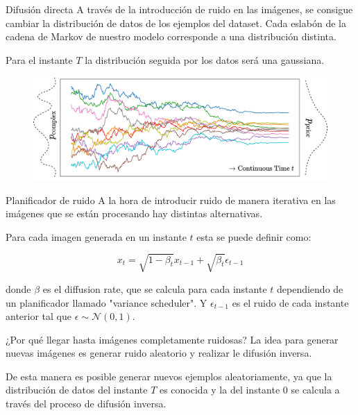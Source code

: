 \begin{frame}{Difusión directa}
A través de la introducción de \alert{ruido} en las imágenes, se consigue cambiar la \alert{distribución de datos} de los ejemplos del dataset. Cada eslabón de la \alert{cadena de Markov} de nuestro modelo corresponde a una distribución distinta.

Para el instante \alert{$T$} la distribución seguida por los datos será una \alert{gaussiana}.

\begin{figure}
    \centering
    \includegraphics[width=\textwidth]{Slides/figures/Diffusion_Models/ForwardDiffusion.png}
    \caption{\cite{ForwardDiffusion}}
\end{figure}
\end{frame}

\begin{frame}{Planificador de ruido}
A la hora de introducir ruido de manera \alert{iterativa} en las imágenes que se están procesando hay distintas alternativas.

Para cada imagen generada en un instante $t$ esta se puede definir como:

\begin{equation}
    x_t = \sqrt{1-\beta_t} x_{t-1} + \sqrt{\beta_t} \epsilon_{t-1}
\end{equation}

donde $\beta$ es el \alert{diffusion rate}, que se calcula para cada instante $t$ dependiendo de un planificador llamado "\alert{variance scheduler}". Y $\epsilon_{t-1}$ es el ruido de cada instante anterior tal que \alert{$\epsilon \sim \mathcal{N}(0,1)$}.

\end{frame}

\begin{frame}{¿Por qué llegar hasta imágenes completamente ruidosas?}
La idea para generar \alert{nuevas imágenes} es generar \alert{ruido aleatorio} y realizar le difusión inversa.

De esta manera es posible generar \alert{nuevos ejemplos} aleatoriamente, ya que la distribución de datos del instante \alert{$T$} es conocida y la del instante \alert{$0$} se calcula a través del proceso de difusión inversa.
\end{frame}


